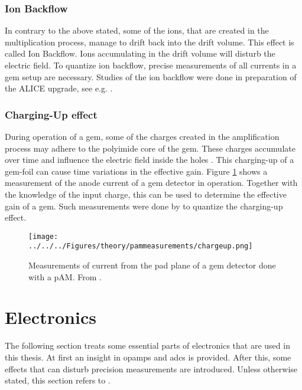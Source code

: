 \subsubsection{Ion Backflow}
In contrary to the above stated, some of the ions, that are created in the multiplication process, manage to drift back into the drift volume. This effect is called Ion Backflow. Ions accumulating in the drift volume will disturb the electric field. To quantize ion backflow, precise measurements of all currents in a \ac{gem} setup are necessary. Studies of the ion backflow were done in preparation of the \ac{ALICE} upgrade, see e.g. \cite{Ball_2014}.
\subsubsection{Charging-Up effect}
During operation of a \ac{gem}, some of the charges created in the amplification process may adhere to the polyimide core of the \ac{gem}. These charges accumulate over time and influence the electric field inside the holes \cite{chargingup}. This charging-up of a \ac{gem}-foil can cause time variations in the effective gain. 
Figure \ref{fig:theory:measurement} shows a measurement of the anode current of a \ac{gem} detector in operation. Together with the knowledge of the input charge, this can be used to determine the effective gain of a \ac{gem}. Such measurements were done by \cite{chargingup} to quantize the charging-up effect.
\begin{figure}
	\centering
	\texttt{[image: ../../../Figures/theory/pammeasurements/chargeup.png]}
	\caption{Measurements of current from the pad plane of a \ac{gem} detector done with a \ac{pAM}. From \cite{chargingup}.}
	\label{fig:theory:measurement}
\end{figure}


\section{Electronics}
The following section treats some essential parts of electronics that are used in this thesis. At first an insight in \acp{opamp} and \acp{adc} is provided. After this, some effects that can disturb precision measurements are introduced. Unless otherwise stated, this section refers to \cite{art}. 
